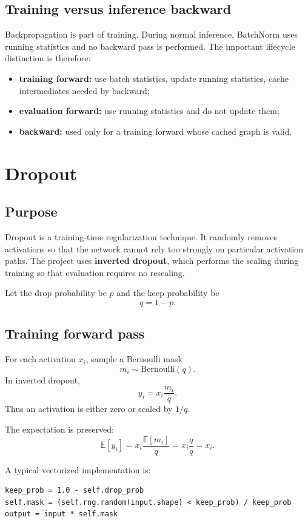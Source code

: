 \documentclass[11pt,a4paper]{article}
\begin{document}
\subsection{Training versus inference backward}

Backpropagation is part of training. During normal inference, BatchNorm uses running statistics and no backward pass is performed. The important lifecycle distinction is therefore:
\begin{itemize}
    \item \textbf{training forward:} use batch statistics, update running statistics, cache intermediates needed by backward;
    \item \textbf{evaluation forward:} use running statistics and do not update them;
    \item \textbf{backward:} used only for a training forward whose cached graph is valid.
\end{itemize}

\newpage
\section{Dropout}

\subsection{Purpose}

Dropout is a training-time regularization technique. It randomly removes activations so that the network cannot rely too strongly on particular activation paths. The project uses \textbf{inverted dropout}, which performs the scaling during training so that evaluation requires no rescaling.

Let the drop probability be $p$ and the keep probability be
\[
q=1-p.
\]

\subsection{Training forward pass}

For each activation $x_i$, sample a Bernoulli mask
\[
m_i\sim\mathrm{Bernoulli}(q).
\]
In inverted dropout,
\[
\boxed{y_i=x_i\frac{m_i}{q}}.
\]
Thus an activation is either zero or scaled by $1/q$.

The expectation is preserved:
\[
\mathbb{E}[y_i]
=x_i\frac{\mathbb{E}[m_i]}{q}
=x_i\frac{q}{q}
=x_i.
\]

A typical vectorized implementation is:
\begin{lstlisting}
keep_prob = 1.0 - self.drop_prob
self.mask = (self.rng.random(input.shape) < keep_prob) / keep_prob
output = input * self.mask
\end{lstlisting}
\end{document}
